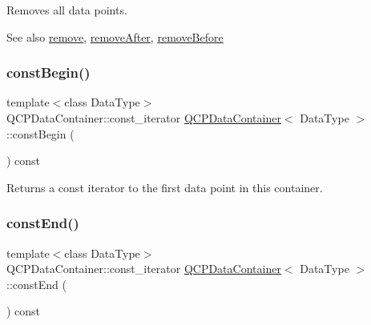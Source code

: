 Removes all data points.

\begin{DoxySeeAlso}{See also}
\hyperlink{class_q_c_p_data_container_ae5f569a120648b167efa78835f12fd38}{remove}, \hyperlink{class_q_c_p_data_container_abbe5d87ffc10b5aeffa5bb42cf03aa3c}{remove\+After}, \hyperlink{class_q_c_p_data_container_aa7f74cbce304b0369e1626c3798e1eda}{remove\+Before} 
\end{DoxySeeAlso}
\mbox{\label{class_q_c_p_data_container_a49d7622999e2de67fa2331626a3159aa}} 
\subsubsection{\texorpdfstring{const\+Begin()}{constBegin()}}
{\footnotesize\ttfamily template$<$class Data\+Type$>$ \\
Q\+C\+P\+Data\+Container\+::const\+\_\+iterator \hyperlink{class_q_c_p_data_container}{Q\+C\+P\+Data\+Container}$<$ Data\+Type $>$\+::const\+Begin (\begin{DoxyParamCaption}{ }\end{DoxyParamCaption}) const\hspace{0.3cm}{\ttfamily [inline]}}

Returns a const iterator to the first data point in this container. \mbox{\label{class_q_c_p_data_container_aa7f7cf239b85b1a28de3d675cc5b3da1}} 
\subsubsection{\texorpdfstring{const\+End()}{constEnd()}}
{\footnotesize\ttfamily template$<$class Data\+Type$>$ \\
Q\+C\+P\+Data\+Container\+::const\+\_\+iterator \hyperlink{class_q_c_p_data_container}{Q\+C\+P\+Data\+Container}$<$ Data\+Type $>$\+::const\+End (\begin{DoxyParamCaption}{ }\end{DoxyParamCaption}) const\hspace{0.3cm}{\ttfamily [inline]}}

